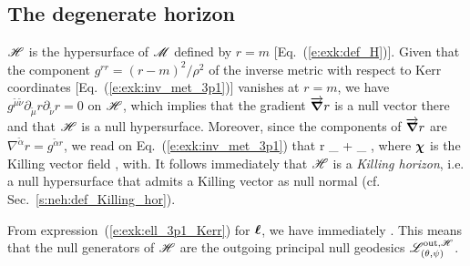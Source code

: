 \subsection{The degenerate horizon} \label{s:exk:horizon}

$\mathscr{H}$ is the hypersurface of $\mathscr{M}$ defined by $r=m$ [Eq.~(\ref{e:exk:def_H})]. Given
that the component $g^{rr} = (r - m)^2/\rho^2$ of the inverse metric with respect to Kerr coordinates
[Eq.~(\ref{e:exk:inv_met_3p1})] vanishes at $r=m$, we have
$g^{\tilde{\mu}\tilde{\nu}} \partial_{\tilde{\mu}} r \partial_{\tilde{\nu}} r = 0$ on $\mathscr{H}$,
which implies that the gradient $\overrightarrow{\bm{\nabla}} r$
is a null vector there and that $\mathscr{H}$ is a null hypersurface.
Moreover, since the components of $\overrightarrow{\bm{\nabla}} r$ are $\nabla^{\tilde{\alpha}} r = g^{\tilde{\alpha}r}$,
we read on Eq.~(\ref{e:exk:inv_met_3p1}) that
\be
    \vw{\nabla} r \equalH {} \wpar_{\ti} +  \wpar_{\tph}
        \equalH {} \w{\chi} ,
\ee
where $\bm{\chi}$ is the Killing vector field
\be \label{e:exk:def_chi}
    \encadre{\w{\chi} := \w{\xi} + \Omega_{\Hor} \w{\eta} },
    \qquad\mbox{with}\quad {}.
\ee
It follows immediately that $\mathscr{H}$ is a \emph{Killing horizon}, i.e. a null hypersurface
that admits a Killing vector as null normal (cf. Sec.~\ref{s:neh:def_Killing_hor}).

From expression~(\ref{e:exk:ell_3p1_Kerr}) for $\bm{\ell}$, we have immediately
\be \label{e:exk:ell_chi_on_H}
    \wl \equalH \w{\chi} .
\ee
This means that the null generators of $\mathscr{H}$ are the outgoing principal null
geodesics $\mathscr{L}^{{\rm out},\mathscr{H}}_{(\theta,\psi)}$.

